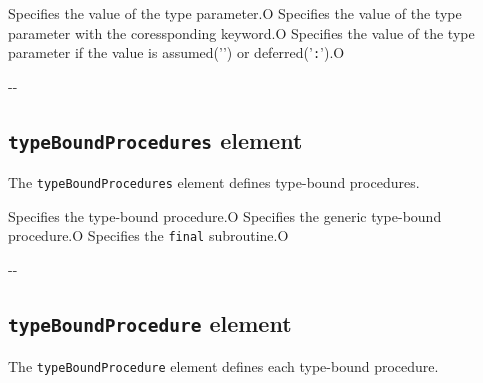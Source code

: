 \begin{XcodeMLChildElements}
{Specifies the value of the type parameter.}{O}
{Specifies the value of the type parameter with the coressponding keyword.}{O}
{Specifies the value of the type parameter if the value is assumed('{\tt *}') or deferred('{\tt :}').}{O}
\end{XcodeMLChildElements}

\begin{XcodeMLAttributes}
\XcodeMLAttrDef{-}{-}
{-}{-}
\end{XcodeMLAttributes}


\subsection{ {\tt typeBoundProcedures} element}

The {\tt typeBoundProcedures} element defines type-bound procedures.


\begin{XcodeMLChildElements}
{Specifies the type-bound procedure.}{O}
{Specifies the generic type-bound procedure.}{O}
{Specifies the {\tt final} subroutine.}{O}
\end{XcodeMLChildElements}

\begin{XcodeMLAttributes}
\XcodeMLAttrDef{-}{-}
{-}{-}
\end{XcodeMLAttributes}


\subsection{ {\tt typeBoundProcedure} element}

The {\tt typeBoundProcedure} element defines each type-bound procedure.


